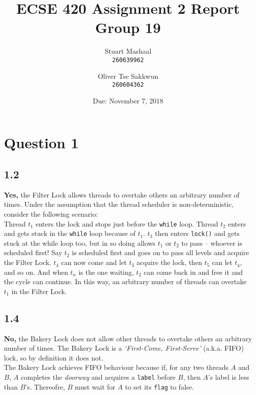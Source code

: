 \documentclass[11pt, letterpaper]{article}
\title{ECSE 420 Assignment 2 Report\\Group 19}
\author{
    Stuart Mashaal\\
    \texttt{260639962}
    \and
    Oliver Tse Sakkwun\\
    \texttt{260604362}
}
\date{Due: November 7, 2018}
\newcommand{\code}[1] { \texttt{#1} }
\begin{document}
\begin{titlepage}
    \maketitle
    \thispagestyle{empty}
    \setcounter{page}{0}
\end{titlepage}

\section*{Question 1}
\label{sec:question_1}

\subsection*{1.2}
\label{sub:1_2}

\textbf{Yes,} the Filter Lock allows threads to overtake others an arbitrary number of times. Under the assumption that the thread scheduler is non-deterministic, consider the following scenario:\\

Thread $t_1$ enters the lock and stops just before the \code{while} loop. Thread $t_2$ enters and gets stuck in the \code{while} loop because of $t_1$. $t_3$ then enters \code{lock()} and gets stuck at the while loop too, but in so doing allows $t_1$ or $t_2$ to pass -- whoever is scheduled first! Say $t_2$ is scheduled first and goes on to pass all levels and acquire the Filter Lock. $t_4$ can now come and let $t_3$ acquire the lock, then $t_5$ can let $t_4$, and so on. And when $t_n$ is the one waiting, $t_2$ can come back in and free it and the cycle can continue. In this way, an arbitrary number of threads can overtake $t_1$ in the Filter Lock.

\subsection*{1.4}
\label{sub:1_4}

\textbf{No,} the Bakery Lock does not allow other threads to overtake others an arbitrary number of times. The Bakery Lock is a \textit{`First-Come, First-Serve'} (a.k.a. FIFO) lock, so by definition it does not.\\

The Bakery Lock achieves FIFO behaviour because if, for any two threads $A$ and $B$, $A$ completes the \textit{doorway} and acquires a \code{label} before $B$, then $A$'s label is less than $B$'s. Thereofre, $B$ must wait for $A$ to set its \code{flag} to false.\\
\end{document}
